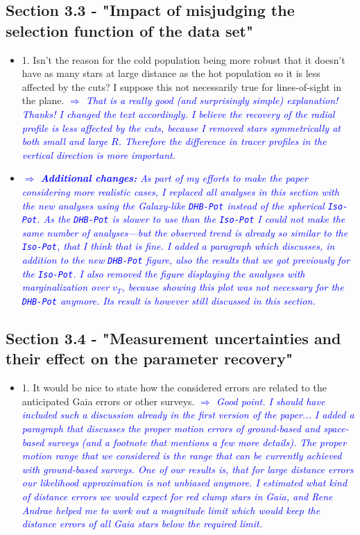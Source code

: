 \documentclass[10pt,a4paper]{article}
\newcommand{\Comment}[1]{\textsl{\textcolor{Blue}{$\Longrightarrow$ {#1}}}}
\begin{document}
\subsection{Section 3.3 - "Impact of misjudging the selection function of the data set"}
\begin{itemize}
\item 1. Isn't the reason for the cold population being more robust that it doesn't have as many stars at large distance as the hot population so it is less affected by the cuts? I suppose this not necessarily true for lines-of-sight in the plane. \Comment{That is a really good (and surprisingly simple) explanation! Thanks! I changed the text accordingly. I believe the recovery of the radial profile is less affected by the cuts, because I removed stars symmetrically at both small and large $R$. Therefore the difference in tracer profiles in the vertical direction is more important.}
\item \Comment{\textbf{Additional changes:} As part of my efforts to make the paper considering more realistic cases, I replaced all analyses in this section with the new analyses using the Galaxy-like \texttt{DHB-Pot} instead of the spherical \texttt{Iso-Pot}. As the \texttt{DHB-Pot} is slower to use than the \texttt{Iso-Pot} I could not make the same number of analyses---but the observed trend is already so similar to the \texttt{Iso-Pot}, that I think that is fine. I added a paragraph which discusses, in addition to the new \texttt{DHB-Pot} figure, also the results that we got previously for the \texttt{Iso-Pot}. I also removed the figure displaying the analyses with marginalization over $v_T$, because showing this plot was not necessary for the \texttt{DHB-Pot} anymore. Its result is however still discussed in this section.}
\end{itemize}

\subsection{Section 3.4 - "Measurement uncertainties and their effect on the parameter recovery"}
\begin{itemize}
\item 1. It would be nice to state how the considered errors are related to the anticipated Gaia errors or other surveys. \Comment{Good point. I should have included such a discussion already in the first version of the paper... I added a paragraph that discusses the proper motion errors of ground-based and space-based surveys (and a footnote that mentions a few more details). The proper motion range that we considered is the range that can be currently achieved with ground-based surveys. One of our results is, that for large distance errors our likelihood approximation is not unbiased anymore. I estimated what kind of distance errors we would expect for red clump stars in Gaia, and Rene Andrae helped me to work out a magnitude limit which would keep the distance errors of all Gaia stars below the required limit.}
\end{itemize}
\end{document}
